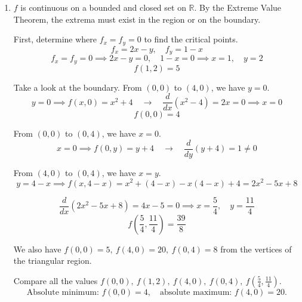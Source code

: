 \documentclass[a4paper, 12pt]{article}
\begin{document}
\begin{enumerate}[leftmargin=*,label=\textbf{\arabic*.}]
\item $f$ is continuous on a bounded and closed set on $\mathbb R$. By the Extreme Value Theorem, the extrema must exist in the region or on the boundary.

First, determine where $f_x=f_y=0$ to find the critical points.
\[f_x=2x-y,\quad f_y=1-x\]
\[f_x=f_y=0\implies2x-y=0,\quad1-x=0\implies x=1,\quad y=2\]
\[f(1,2)=5\]

Take a look at the boundary. From $(0,0)$ to $(4,0)$, we have $y=0$.
\[y=0\implies f(x,0)=x^2+4\quad\rightarrow\quad\frac d{dx}\left(x^2-4\right)=2x=0\implies x=0\]
\[f(0,0)=4\]

From $(0,0)$ to $(0,4)$, we have $x=0$.
\[x=0\implies f(0,y)=y+4\quad\rightarrow\quad\frac d{dy}\left(y+4\right)=1\neq0\]

From $(4,0)$ to $(0,4)$, we have $x=y$.
\[y=4-x\implies f(x,4-x)=x^2+(4-x)-x(4-x)+4=2x^2-5x+8\]

\[\frac d{dx}\left(2x^2-5x+8\right)=4x-5=0\implies x=\frac54,\quad y=\frac{11}4\]
\[f\left(\frac54,\frac{11}4\right)=\frac{39}8\]

We also have $f(0,0)=5,\:f(4,0)=20,\:f(0,4)=8$ from the vertices of the triangular region.

Compare all the values $f(0,0),\:f(1,2),\:f(4,0),\:f(0,4),\:f\left(\frac54,\frac{11}4\right)$.
\[\boxed{\text{Absolute minimum: }f(0,0)=4,\quad \text{absolute maximum: } f(4,0)=20.}\]
\end{enumerate}

\newpage
{}
{}

\newpage
{}

\end{document}
